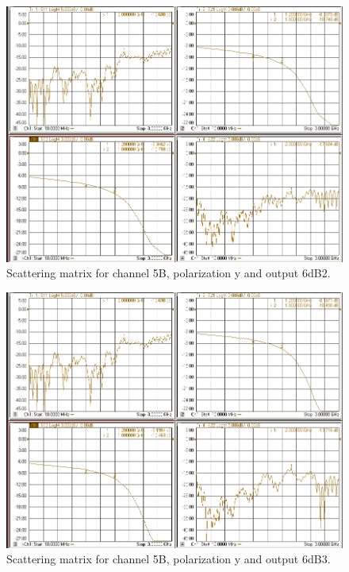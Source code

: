 \documentclass[12pt,a4paper,oneside]{article}
\begin{document}
\begin{figure}[H]
\centering
\includegraphics[width=0.9\linewidth]{VNA_results/5By_6dB2.png}
\caption{Scattering matrix for channel 5B, polarization y and output 6dB2.}
\label{fig:5By_6dB2}
\end{figure}


\begin{figure}[H]
\centering
\includegraphics[width=0.9\linewidth]{VNA_results/5By_6dB3.png}
\caption{Scattering matrix for channel 5B, polarization y and output 6dB3.}
\label{fig:5By_6dB3}
\end{figure}
\end{document}
